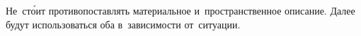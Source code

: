 \begin{otherlanguage}{russian}
\vspace{-0.1em} Не~ст\'{о}ит противопоставлять материальное и~пространственное описание. Далее будут использоваться оба в~зависимости от~ситуации.

\end{otherlanguage}

\newpage



\label{para:motiongradient}

